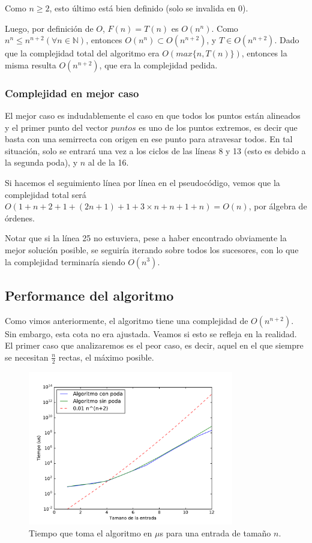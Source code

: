   Como $n \geq 2$, esto último está bien definido (solo se invalida en 0).

  Luego, por definición de $O$, $F(n) = T(n)$ es $O(n^n)$. Como $n^n\leq n^{n+2} (\forall n \in \mathbb{N})$, entonces $O(n^n)\subset O(n^{n+2})$, y $T\in O(n^{n+2})$. Dado que la complejidad total del algoritmo era $O(max\{n, T(n)\})$, entonces la misma resulta $O(n^{n+2})$, que era la complejidad pedida.

\subsubsection{Complejidad en mejor caso}

El mejor caso es indudablemente el caso en que todos los puntos están alineados y el primer punto del vector $puntos$ es uno de los puntos extremos, es decir que basta con una semirrecta con origen en ese punto para atravesar todos. En tal situación, solo se entrará una vez a los ciclos de las líneas 8 y 13 (esto es debido a la segunda poda), y $n$ al de la 16.

Si hacemos el seguimiento línea por línea en el pseudocódigo, vemos que la complejidad total será $O(1+n+2+1+(2n+1)+1+3\times n+n+1+n) = O(n)$, por álgebra de órdenes.

Notar que si la línea 25 no estuviera, pese a haber encontrado obviamente la mejor solución posible, se seguiría iterando sobre todos los sucesores, con lo que la complejidad terminaría siendo $O(n^3)$. 

\subsection{Performance del algoritmo}

Como vimos anteriormente, el algoritmo tiene una complejidad de $O(n^{n+2})$. Sin embargo, esta cota no era ajustada. Veamos si esto se refleja en la realidad. El primer caso que analizaremos es el peor caso, es decir, aquel en el que siempre se necesitan $\frac{n}{2}$ rectas, el máximo posible.

\begin{figure}[H]
 \centering
	\includegraphics[width=0.8\textwidth]{img/tiempos/kamehameha1.pdf}
	\caption{\footnotesize Tiempo que toma el algoritmo en $\mu$s para una entrada de tamaño $n$.}
	\label{fig:kamehameha-tiempos1}
\end{figure}


